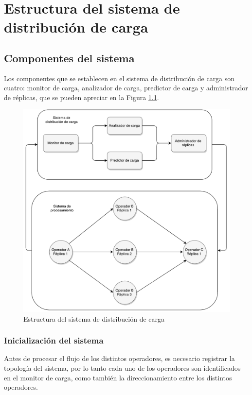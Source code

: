\chapter{Estructura del sistema de distribución de carga}
\label{cap:estructuraSistema}
\section{Componentes del sistema}
	Los componentes que se establecen en el sistema de distribución de carga son cuatro: monitor de carga, analizador de carga, predictor de carga y administrador de réplicas, que se pueden apreciar en la Figura \ref{fig:componentesSistemas}. 

\begin{figure}[hb!]
  \centering
    \includegraphics[scale=0.5]{images/Diagrama.pdf}
  \caption{Estructura del sistema de distribución de carga}
  \label{fig:componentesSistemas}
\end{figure}

\subsection{Inicialización del sistema}
	Antes de procesar el flujo de los distintos operadores, es necesario registrar la topología del sistema, por lo tanto cada uno de los operadores son identificados en el monitor de carga, como también la direccionamiento entre los distintos operadores.
	
